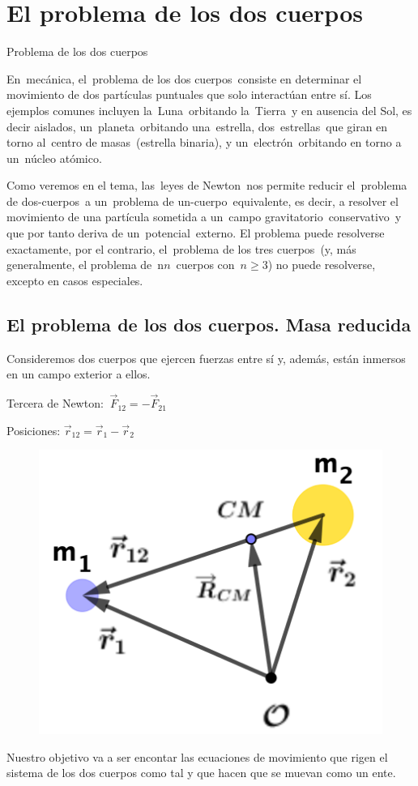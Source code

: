 \chapter{El problema de los dos cuerpos}

\begin{miparrafo}
Problema de los dos cuerpos

En mecánica, el problema de los dos cuerpos consiste en determinar el movimiento de dos partículas puntuales que solo interactúan entre sí. Los ejemplos comunes incluyen la Luna orbitando la Tierra y en ausencia del Sol, es decir aislados, un planeta orbitando una estrella, dos estrellas que giran en torno al centro de masas (estrella binaria), y un electrón orbitando en torno a un núcleo atómico. 

Como veremos en el tema, las leyes de Newton nos permite reducir el problema de dos-cuerpos a un problema de un-cuerpo equivalente, es decir, a resolver el movimiento de una partícula sometida a un campo gravitatorio conservativo y que por tanto deriva de un potencial externo.  El problema puede resolverse exactamente, por el contrario, el problema de los tres cuerpos (y, más generalmente, el problema de n$n$ cuerpos con $n\geq 3$) no puede resolverse, excepto en casos especiales.	
\end{miparrafo}

\section[El problema de los dos cuerpos. Masa reducida]{El problema de los dos cuerpos. Masa reducida}

\begin{multicols}{2}
Consideremos dos cuerpos que ejercen fuerzas entre sí y, además, están inmersos en un campo exterior a ellos.

Tercera de Newton: $\ \vec F_{12}=-\vec F_{21}$

Posiciones: $\vec r_{12}=\vec r_1- \vec r_2$

\begin{figure}[H]
	\centering
	\includegraphics[width=.3\textwidth]{imagenes/imagenes13/T13IM01.png}
\end{figure}
\end{multicols}
Nuestro objetivo va a ser encontar las ecuaciones de movimiento que rigen el sistema de los dos cuerpos como tal y que hacen que se muevan como un ente.

